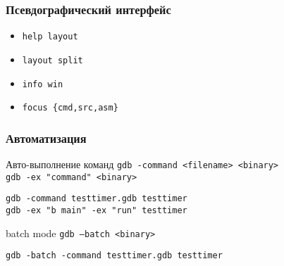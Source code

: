 \begin{frame}
 \frametitle{Псевдографический интерфейс}
   \begin{itemize}
     \item {\tt help layout}
     \item {\tt layout split}
     \item {\tt info win}
     \item {\tt focus \{cmd,src,asm\}}
   \end{itemize}
\end{frame}

\begin{frame}[fragile]
 \frametitle{Автоматизация}

    \begin{block}{Авто-выполнение команд}
    {\tt gdb -command <filename> <binary>}\\
    {\tt gdb -ex "command" <binary>}\\
        \begin{verbatim}
gdb -command testtimer.gdb testtimer
gdb -ex "b main" -ex "run" testtimer
\end{verbatim}
    \end{block}

    \begin{block}{batch mode}
    {\tt gdb --batch <binary>}
        \begin{verbatim}
gdb -batch -command testtimer.gdb testtimer
\end{verbatim}
    \end{block}

\end{frame}
